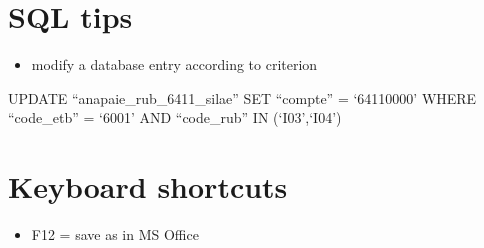 \documentclass[
]{book}
\providecommand{\tightlist}{%
  \setlength{\itemsep}{0pt}\setlength{\parskip}{0pt}}
\begin{document}
\hypertarget{sql-tips}{%
\chapter{SQL tips}\label{sql-tips}}

\begin{itemize}
\tightlist
\item
  modify a database entry according to criterion
\end{itemize}

UPDATE ``anapaie\_rub\_6411\_silae'' SET ``compte'' = `64110000'
WHERE ``code\_etb'' = `6001' AND ``code\_rub'' IN (`I03',`I04')

\hypertarget{keyboard-shortcuts}{%
\chapter{Keyboard shortcuts}\label{keyboard-shortcuts}}

\begin{itemize}
\tightlist
\item
  F12 = save as in MS Office
\end{itemize}

  
\end{document}
